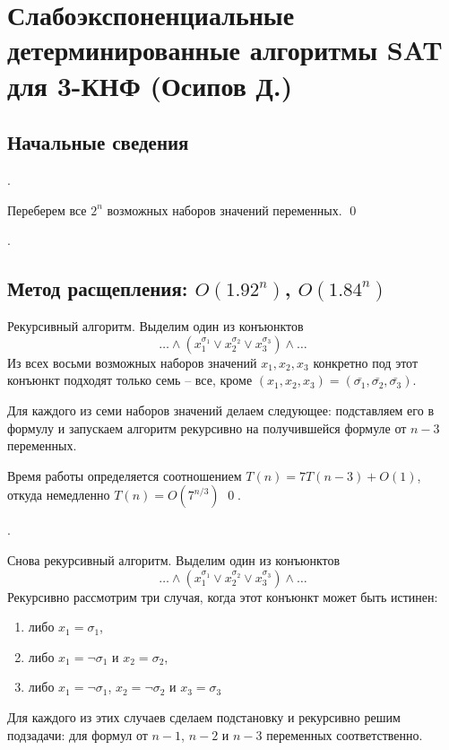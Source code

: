 \hypertarget{3sat}{}
\section{Слабоэкспоненциальные детерминированные алгоритмы SAT для 3-КНФ (Осипов Д.)}
\subsection{Начальные сведения}
.

 Переберем все $2^n$ возможных наборов значений переменных. \qed


.


\subsection{Метод расщепления: $O(1.92^n)$, $O(1.84^n)$}

Рекурсивный алгоритм. Выделим один из конъюнктов $$\ldots\land(x_1^{\sigma_1} \lor x_2^{\sigma_2} \lor x_3^{\sigma_3})\land\ldots$$ Из всех восьми возможных наборов значений $x_1, x_2, x_3$ конкретно под этот конъюнкт подходят только семь -- все, кроме $(x_1, x_2, x_3) = (\bar{\sigma_1}, \bar{\sigma_2}, \bar{\sigma_3})$. 

Для каждого из семи наборов значений делаем следующее: подставляем его в формулу и запускаем алгоритм рекурсивно на получившейся формуле от $n-3$ переменных.

Время работы определяется соотношением $T(n) = 7T(n-3) + O(1)$, откуда немедленно $T(n) = O(7^{n/3})$ \qed.

\needpicture

. 

Снова рекурсивный алгоритм. Выделим один из конъюнктов $$\ldots\land(x_1^{\sigma_1} \lor x_2^{\sigma_2} \lor x_3^{\sigma_3})\land\ldots$$ Рекурсивно рассмотрим три случая, когда этот конъюнкт может быть истинен:
\begin{enumerate}
\item либо $x_1 = \sigma_1$,
\item либо $x_1 = \neg\sigma_1$ и $x_2 = \sigma_2$,
\item либо $x_1 = \neg\sigma_1$, $x_2 = \neg\sigma_2$ и $x_3 = \sigma_3$
\end{enumerate}
Для каждого из этих случаев сделаем подстановку и рекурсивно решим подзадачи: для формул от $n-1$, $n-2$ и $n-3$ переменных соответственно. 

